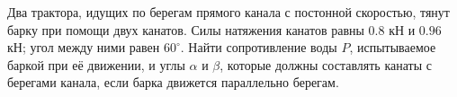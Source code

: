 Два трактора, идущих по берегам прямого канала с постонной скоростью,
тянут барку при помощи двух канатов.
Силы натяжения канатов равны $0.8$ кН и $0.96$ кН;
угол между ними равен $60^\circ$.
Найти сопротивление воды $P$, испытываемое баркой при её движении,
и углы $\alpha$ и $\beta$,
которые должны составлять канаты с берегами канала,
если барка движется параллельно берегам.
